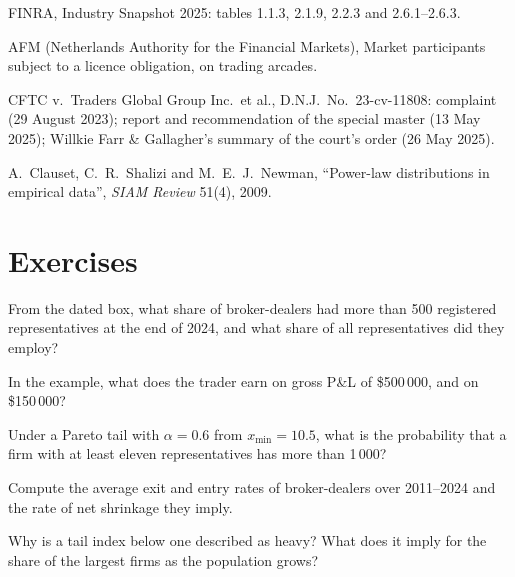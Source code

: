 \begin{omsources}
\item FINRA, Industry Snapshot 2025: tables 1.1.3, 2.1.9, 2.2.3 and 2.6.1--2.6.3.
\item AFM (Netherlands Authority for the Financial Markets), Market participants subject to a licence obligation, on
trading arcades.
\item CFTC v.\ Traders Global Group Inc.\ et al., D.N.J.\ No.~23-cv-11808: complaint (29 August 2023); report and
recommendation of the special master (13 May 2025); Willkie Farr \& Gallagher's summary of the court's order (26 May 2025).
\item A.~Clauset, C.~R.~Shalizi and M.~E.~J.~Newman, ``Power-law distributions in empirical data'', \emph{SIAM Review}
51(4), 2009.
\end{omsources}

\section{Exercises}

\begin{exercise}[$\star$]\label{exo:in:medium-frequency-proprietary-shops:1}
From the dated box, what share of broker-dealers had more than 500 registered representatives at the end of 2024, and
what share of all representatives did they employ?
\end{exercise}

\begin{exercise}[$\star$]\label{exo:in:medium-frequency-proprietary-shops:2}
In the example, what does the trader earn on gross P\&L of \$500\,000, and on \$150\,000?
\end{exercise}

\begin{exercise}[$\star$]\label{exo:in:medium-frequency-proprietary-shops:3}
Under a Pareto tail with $\alpha=0.6$ from $x_{\min}=10.5$, what is the probability that a firm with at least eleven
representatives has more than 1\,000?
\end{exercise}

\begin{exercise}[$\star\star$]\label{exo:in:medium-frequency-proprietary-shops:4}
Compute the average exit and entry rates of broker-dealers over 2011--2024 and the rate of net shrinkage they imply.
\end{exercise}

\begin{exercise}[$\star\star$]\label{exo:in:medium-frequency-proprietary-shops:5}
Why is a tail index below one described as heavy? What does it imply for the share of the largest firms as the
population grows?
\end{exercise}


